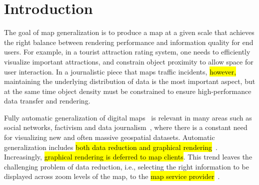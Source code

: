 \section{Introduction}






The goal of map generalization is to produce a map at a given scale that achieves the right balance between rendering performance and information quality for end users. For example, in a tourist attraction rating system, one needs to efficiently visualize important attractions, and constrain object proximity to allow space for user interaction. In a journalistic piece that maps traffic incidents, \hl{however,} maintaining the underlying distribution of data is the most important aspect, but at the same time object density must be constrained to ensure high-performance data transfer and rendering.


Fully automatic generalization of digital maps~\cite{sarma2012fusiontables,nutanong2012multiresolution} is relevant in many areas such as social networks, factivism and data journalism~\cite{cohen2011journalism,bono,sankaranarayanan2009twitterstand}, where there is a constant need for visualizing new and often massive geospatial datasets. Automatic generalization includes \hl{both data reduction and graphical rendering}~\cite{weibel1999generalising,gruenreich1985cag}. Increasingly, \hl{graphical rendering is deferred to map clients}. This trend leaves the challenging problem of data reduction, i.e., selecting the right information to be displayed across zoom levels of the map, to the \hl{map service provider}~\cite{gaffuri12vectortiles}. 

